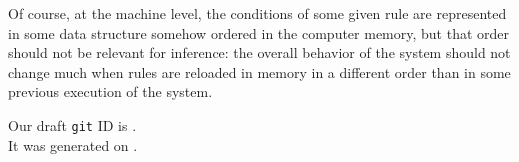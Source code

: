 \documentclass{svproc}
\begin{document}
Of course, at the machine level, the conditions of some given rule are
represented in some data structure somehow ordered in the computer
memory, but that order should not be relevant for inference: the
overall behavior of the system should not change much when rules are
reloaded in memory in a different order than in some previous
execution of the \RefPerSys{} system.



\begin{flushright}
  \begin{relsize}{-1}
    Our draft \texttt{git} ID is \texttt{\textit{\rpsgitcommit}}. \\
    It was generated on \texttt{\rpsdate}.
  \end{relsize}
\end{flushright}
\end{document}

